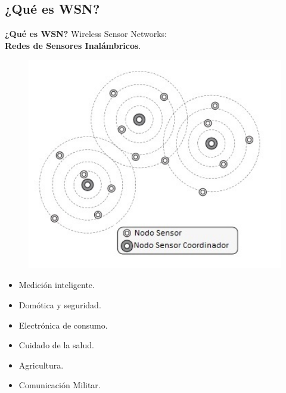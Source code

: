 \documentclass[aspectratio=43, handout]{beamer}
\begin{document}
\subsection[WSN]{¿Qué es WSN?}
\begin{frame}{\textbf{\LARGE{¿Qué es WSN?}}}
\fontsize{14pt}{14}\selectfont
\noindent Wireless Sensor Networks:\\
\textbf{Redes de Sensores Inalámbricos}.
\begin{minipage}[c]{1.0\linewidth}
	\begin{minipage}[c]{0.4\linewidth}
		\begin{figure}[H]			
		\includegraphics[width=1.2\textwidth]{./imagenes/WSN.jpg}
		\end{figure}	  	  	
	\end{minipage}
	\begin{minipage}[c]{0.55\linewidth}
					\vspace{10px}
		\begin{itemize}
			\item Medición inteligente.
			\vspace{5px}
			\item Domótica y seguridad.
			\vspace{5px}
			\item Electrónica de consumo.
			\vspace{5px}
			\item Cuidado de la salud.
			\vspace{5px}
			\item Agricultura.
			\vspace{5px}
			\item Comunicación Militar.
			\vspace{5px}
		\end{itemize}
\end{minipage}
\end{minipage}
\end{frame}
\end{document}

